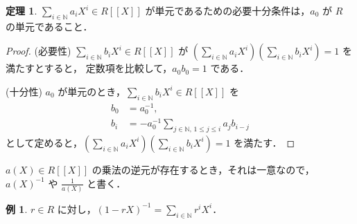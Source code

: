 \documentclass{jsarticle}
\newcommand{\N}{\mathbb{N}}
\theoremstyle{definition}
\newtheorem{thm}{定理}
\newtheorem*{exm}{例}
\begin{document}
\begin{thm}
  $\sum_{i\in\N} a_i X^i \in R[[X]]$ が単元であるための必要十分条件は，$a_0$ が $R$ の単元であること．
\end{thm}
\begin{proof}
  (必要性)
  $\sum_{i\in\N} b_i X^i \in R[[X]]$ が $\left(\sum_{i\in\N} a_i X^i\right) \left(\sum_{i\in\N} b_i X^i\right) = 1$ を満たすとすると，
  定数項を比較して，$a_0 b_0 = 1$ である．

  (十分性)
  $a_0$ が単元のとき，$\sum_{i\in\N} b_i X^i \in R[[X]]$ を
  \begin{align*}
    b_0 &= a_0^{-1}, \\
    b_i &= -a_0^{-1} \sum_{j\in\N,\,1\le j\le i} a_j b_{i-j}
  \end{align*}
  として定めると，$\left(\sum_{i\in\N} a_i X^i\right) \left(\sum_{i\in\N} b_i X^i\right) = 1$ を満たす．
\end{proof}

$a(X) \in R[[X]]$ の乗法の逆元が存在するとき，それは一意なので，
$a(X)^{-1}$ や $\frac{1}{a(X)}$ と書く．

\begin{exm}
  $r \in R$ に対し，$(1 - r X)^{-1} = \sum_{i\in\N} r^i X^i$．
\end{exm}
\end{document}
